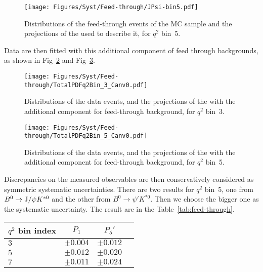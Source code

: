 \begin{figure}[!hbt]
  \centering
  \texttt{[image: Figures/Syst/Feed-through/JPsi-bin5.pdf]}
  \caption{Distributions of the feed-through events of the \BtoKstJpsi MC sample and the projections of the \pdf used to describe it, for $q^2$ bin~5.
  }
  \label{fig:feed-J-bin5}
\end{figure} 

Data are then fitted with this additional component of feed through backgrounds, as shown in Fig~\ref{fig:feed-t-bin3} and Fig~\ref{fig:feed-t-bin5}.

\begin{figure}[!hbt]
  \centering
  \texttt{[image: Figures/Syst/Feed-through/TotalPDFq2Bin\_3\_Canv0.pdf]}
  \caption{Distributions of the data events, and the projections of the \pdf with the additional component for feed-through background, for $q^2$ bin~3.}
  \label{fig:feed-t-bin3}
\end{figure}

\begin{figure}[!hbt]
  \centering
  \texttt{[image: Figures/Syst/Feed-through/TotalPDFq2Bin\_5\_Canv0.pdf]}
  \caption{Distributions of the data events, and the projections of the \pdf with the additional component for feed-through background, for $q^2$ bin~5.}
  \label{fig:feed-t-bin5}
\end{figure} 

Discrepancies on the measured observables are then conservatively considered as symmetric systematic uncertainties.
There are two results for $q^2$ bin~5, one from $B^0 \to {\rm J/}\psi K^{*0}$ and the other from $B^0 \to \psi' K^{*0}$.
Then we choose the bigger one as the systematic uncertainty.
The result are in the Table~\ref{tab:feed-through}.

\begin{table*}[!htb]
  \begin {center}
    \begin{small}
      \caption{Systematic uncertainties from the feed through backgrounds.
        \label{tab:feed-through}}
      \begin{tabular}{l|c|c|c}
        $q^2$ bin index & $P_1$ & $P_5'$ \\
        \hline
        $3$ & $\pm 0.004$ & $\pm 0.012$ \\
        $5$ & $\pm 0.012$ & $\pm 0.020$ \\
        $7$ & $\pm 0.011$ & $\pm 0.024$ \\
      \end{tabular}
    \end{small}
  \end{center}
\end{table*}

